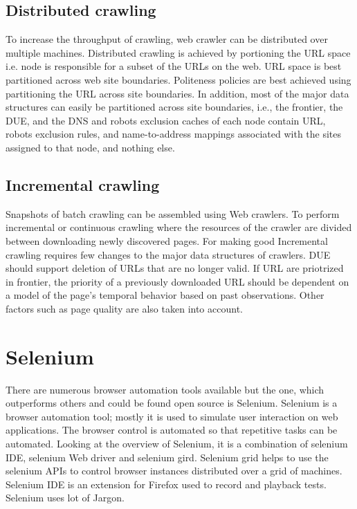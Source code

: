 \documentclass[12pt]{report}
\begin{document}
 
\subsection*{Distributed crawling}

To increase the throughput of crawling, web crawler can be distributed over multiple machines. Distributed crawling is achieved by portioning the URL space i.e. node is responsible for a subset of the URLs on the web. URL space is best partitioned across web site boundaries. Politeness policies are best achieved using partitioning the URL across site boundaries. In addition, most of the major data structures can easily be partitioned across site boundaries, i.e., the frontier, the DUE, and the DNS and robots exclusion caches of each node contain URL, robots exclusion rules, and name-to-address mappings associated with the sites assigned to that node, and nothing else.

\subsection*{Incremental crawling}

Snapshots of batch crawling can be assembled using Web crawlers. To perform incremental or continuous crawling where the resources of the crawler are divided between downloading newly discovered pages. For making good Incremental crawling requires few changes to the major data structures of crawlers. DUE should support deletion of URLs that are no longer valid. If URL are priotrized in frontier, the priority of a previously downloaded URL should be dependent on a model of the page’s temporal behavior based on past observations. Other factors such as page quality are also taken into account.

\section*{Selenium}
There are numerous browser automation tools available but the one, which outperforms others and could be found open source is Selenium. Selenium is a browser automation tool; mostly it is used to simulate user interaction on web applications. The browser control is automated so that repetitive tasks can be automated. Looking at the overview of Selenium, it is a combination of selenium IDE, selenium Web driver and selenium gird. Selenium grid helps to use the selenium APIs to control browser instances distributed over a grid of machines. Selenium IDE is an extension for Firefox used to record and playback tests. Selenium uses lot of Jargon.
\end{document}
